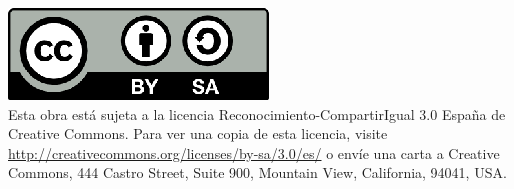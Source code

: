 

\thispagestyle{plain}
\vspace*{\fill}
\begin{center}

\includegraphics{./Imagenes/by-sa.eps}\\
Esta obra está sujeta a la licencia Reconocimiento-CompartirIgual 3.0 España de Creative Commons. Para ver una copia de esta licencia, visite \url{http://creativecommons.org/licenses/by-sa/3.0/es/} o envíe una carta a Creative Commons, 444 Castro Street, Suite 900, Mountain View, California, 94041, USA.

\end{center}